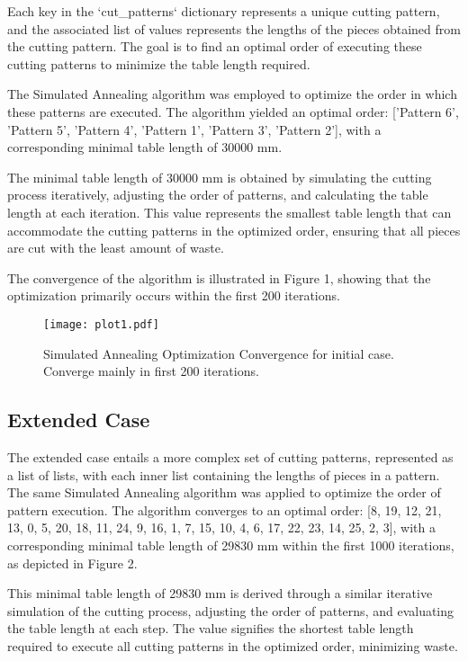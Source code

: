 \documentclass{article}
\begin{document}
Each key in the `cut\_patterns` dictionary represents a unique cutting pattern, and the associated list of values represents the lengths of the pieces obtained from the cutting pattern. The goal is to find an optimal order of executing these cutting patterns to minimize the table length required.

The Simulated Annealing algorithm was employed to optimize the order in which these patterns are executed. The algorithm yielded an optimal order: ['Pattern 6', 'Pattern 5', 'Pattern 4', 'Pattern 1', 'Pattern 3', 'Pattern 2'], with a corresponding minimal table length of 30000 mm. 

The minimal table length of 30000 mm is obtained by simulating the cutting process iteratively, adjusting the order of patterns, and calculating the table length at each iteration. This value represents the smallest table length that can accommodate the cutting patterns in the optimized order, ensuring that all pieces are cut with the least amount of waste. 

The convergence of the algorithm is illustrated in Figure 1, showing that the optimization primarily occurs within the first 200 iterations.

\begin{figure}[h]
    \centering
    \texttt{[image: plot1.pdf]}
    \caption{Simulated Annealing Optimization Convergence for initial case. Converge mainly in first 200 iterations.}
\end{figure}

\subsection{Extended Case}
The extended case entails a more complex set of cutting patterns, represented as a list of lists, with each inner list containing the lengths of pieces in a pattern. The same Simulated Annealing algorithm was applied to optimize the order of pattern execution. The algorithm converges to an optimal order: [8, 19, 12, 21, 13, 0, 5, 20, 18, 11, 24, 9, 16, 1, 7, 15, 10, 4, 6, 17, 22, 23, 14, 25, 2, 3], with a corresponding minimal table length of 29830 mm within the first 1000 iterations, as depicted in Figure 2. 

This minimal table length of 29830 mm is derived through a similar iterative simulation of the cutting process, adjusting the order of patterns, and evaluating the table length at each step. The value signifies the shortest table length required to execute all cutting patterns in the optimized order, minimizing waste.
\end{document}
